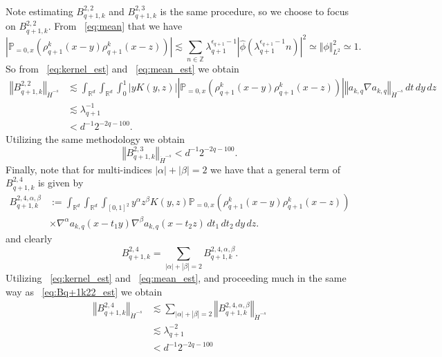 \documentclass[12pt,reqno,letterpaper]{amsart}
\numberwithin{equation}{section}
\newcommand{\1}{{\bf 1}}
\newcommand{\2}{{\bf 2}}
\newcommand{\R}{\mathbb R}
\newcommand{\Z}{\mathbb Z}
\theoremstyle{remark}
\theoremstyle{remark}
\begin{document}
Note estimating $B_{q+1,k}^{2,2}$ and $B_{q+1,k}^{2,3}$ is the same procedure, so we choose to focus on $B_{q+1,k}^{2,2}$. From ~\eqref{eq:mean} that we have
\begin{equation}\label{eq:mean_est}
    \left| \mathbb{P}_{=0,x}\left(\rho_{q+1}^k(x-y) \rho_{q+1}^k(x-z)\right)\right| \lesssim \sum_{n \in \Z} \lambda_{q+1}^{\epsilon_{q+1}-1} \left|\hat{\phi}\left(\lambda_{q+1}^{\epsilon_{q+1}-1}n\right)\right|^2 \simeq \Vert \phi \Vert_{L^2}^2 \simeq 1.
\end{equation}
So from ~\eqref{eq:kernel_est} and ~\eqref{eq:mean_est} we obtain
\begin{equation}\label{eq:Bq+1k22_est}
    \begin{split}
        \left\Vert B_{q+1,k}^{2,2} \right\Vert_{\dot{H}^{-s}} &\lesssim \int_{\R^d} \int_{\R^d} \int_0^1 \left|y K(y,z)\right| \left| \mathbb{P}_{=0,x}\left(\rho_{q+1}^k(x-y) \rho_{q+1}^k(x-z)\right)\right| \left\Vert a_{k,q} \nabla a_{k,q}\right\Vert_{\dot{H}^{-s}}\, dt\, dy\, dz\\
        &\lesssim \lambda_{q+1}^{-1}\\
        &< d^{-1}2^{-2q-100}.
    \end{split}
\end{equation}
Utilizing the same methodology we obtain
\begin{equation}\label{eq:Bq+1k23_est}
    \left\Vert B_{q+1,k}^{2,3} \right\Vert_{\dot{H}^{-s}} < d^{-1} 2^{-2q-100}.
\end{equation}
Finally, note that for multi-indices $|\alpha| + |\beta| = 2$ we have that a general term of $B_{q+1,k}^{2,4}$ is given by
\begin{equation}\label{eq:Bq+1k22_decomp}
    \begin{split}
        B_{q+1,k}^{2,4,\alpha,\beta} &:= \int_{\R^d} \int_{\R^d} \int_{[0,1]^2} y^\alpha z^\beta K(y,z) \mathbb{P}_{=0,x}\left(\rho_{q+1}^k(x-y) \rho_{q+1}^k(x-z)\right)\\
        &\times \nabla^\alpha a_{k,q}(x-t_1y) \nabla^\beta a_{k,q}(x - t_2z)\, dt_1\, dt_2\, dy\, dz.
    \end{split}
\end{equation}
and clearly
$$
B_{q+1,k}^{2,4} = \sum_{|\alpha| + |\beta| = 2} B_{q+1,k}^{2,4,\alpha,\beta}.
$$
Utilizing ~\eqref{eq:kernel_est} and ~\eqref{eq:mean_est}, and proceeding much in the same way as ~\eqref{eq:Bq+1k22_est} we obtain
\begin{equation}\label{eq:Bq+1k24_est}
    \begin{split}
        \left\Vert B^{2,4}_{q+1,k}\right\Vert_{\dot{H}^{-s}} &\lesssim \sum_{|\alpha| + |\beta| = 2} \left\Vert B^{2,4,\alpha,\beta}_{q+1,k}\right\Vert_{\dot{H}^{-s}}\\
        &\lesssim \lambda_{q+1}^{-2}\\
        &< d^{-1} 2^{-2q-100}
    \end{split}
\end{equation}
\end{document}
